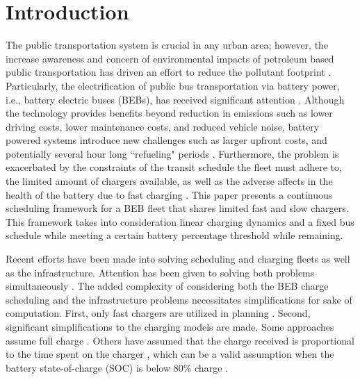 \documentclass[letterpaper, 10pt, conference]{IEEEtran}
\begin{document}
\section{Introduction}
\label{sec:introduction}
The public transportation system is crucial in any urban area; however, the increase awareness and concern of environmental impacts of petroleum based public transportation has driven an effort to reduce the pollutant footprint \cite{DeFilippo2014, Xylia2018, Guida2017, Li2016}. Particularly, the electrification of public bus transportation via battery power, i.e., battery electric buses (BEBs), has received significant attention \cite{Li2016}. Although the technology provides benefits beyond reduction in emissions such as lower driving costs, lower maintenance costs, and reduced vehicle noise, battery powered systems introduce new challenges such as larger upfront costs, and potentially several hour long ``refueling" periods \cite{Xylia2018, Li2016}. Furthermore, the problem is exacerbated by the constraints of the transit schedule the fleet must adhere to, the limited amount of chargers available, as well as the adverse affects in the health of the battery due to fast charging \cite{Lutsey2019}. This paper presents a continuous scheduling framework for a BEB fleet that shares limited fast and slow chargers. This framework takes into consideration linear charging dynamics and a fixed bus schedule while meeting a certain battery percentage threshold while remaining.

Recent efforts have been made into solving scheduling and charging fleets as well as the infrastructure. Attention has been given to solving both problems simultaneously \cite{Wei2018, Sebastiani2016, Hoke2014, Wang2017}.  The added complexity of considering both the BEB charge scheduling and the infrastructure problems necessitates simplifications for sake of computation. First, only fast chargers are utilized in planning \cite{Wei2018, Sebastiani2016, Wang2017, Zhou2020, Liu2020, Yang2018, Wang2017a, Qin2016}. Second, significant simplifications to the charging models are made. Some approaches assume full charge \cite{Wei2018, Wang2017, Zhou2020, Wang2017a}. Others have assumed that the charge received is proportional to the time spent on the charger \cite{Liu2020, Yang2018}, which can be a valid assumption when the battery state-of-charge (SOC) is below 80\% charge \cite{Liu2020}.
\end{document}
